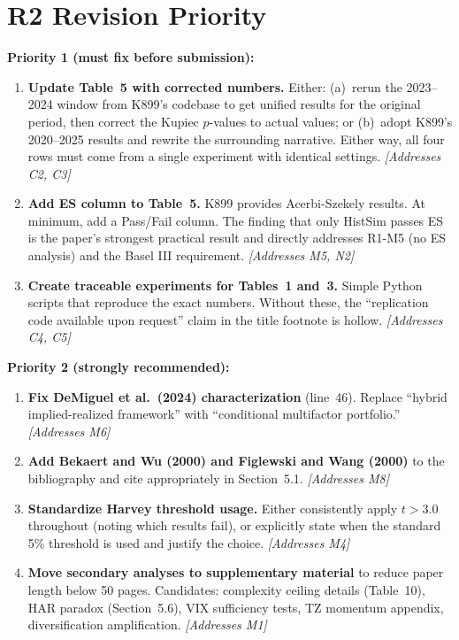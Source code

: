 \documentclass[12pt,a4paper]{article}
\begin{document}
\bigskip

\section*{R2 Revision Priority}

\textbf{Priority 1 (must fix before submission):}
\begin{enumerate}
\item \textbf{Update Table~5 with corrected numbers.} Either: (a)~rerun the 2023--2024 window from K899's codebase to get unified results for the original period, then correct the Kupiec $p$-values to actual values; or (b)~adopt K899's 2020--2025 results and rewrite the surrounding narrative. Either way, all four rows must come from a single experiment with identical settings. \textit{[Addresses C2, C3]}

\item \textbf{Add ES column to Table~5.} K899 provides Acerbi-Szekely results. At minimum, add a Pass/Fail column. The finding that only HistSim passes ES is the paper's strongest practical result and directly addresses R1-M5 (no ES analysis) and the Basel III requirement. \textit{[Addresses M5, N2]}

\item \textbf{Create traceable experiments for Tables~1 and~3.} Simple Python scripts that reproduce the exact numbers. Without these, the ``replication code available upon request'' claim in the title footnote is hollow. \textit{[Addresses C4, C5]}
\end{enumerate}

\textbf{Priority 2 (strongly recommended):}
\begin{enumerate}[resume]
\item \textbf{Fix DeMiguel et al.\ (2024) characterization} (line~46). Replace ``hybrid implied-realized framework'' with ``conditional multifactor portfolio.'' \textit{[Addresses M6]}

\item \textbf{Add Bekaert and Wu (2000) and Figlewski and Wang (2000)} to the bibliography and cite appropriately in Section~5.1. \textit{[Addresses M8]}

\item \textbf{Standardize Harvey threshold usage.} Either consistently apply $t > 3.0$ throughout (noting which results fail), or explicitly state when the standard 5\% threshold is used and justify the choice. \textit{[Addresses M4]}

\item \textbf{Move secondary analyses to supplementary material} to reduce paper length below 50 pages. Candidates: complexity ceiling details (Table~10), HAR paradox (Section~5.6), VIX sufficiency tests, TZ momentum appendix, diversification amplification. \textit{[Addresses M1]}
\end{enumerate}
\end{document}

